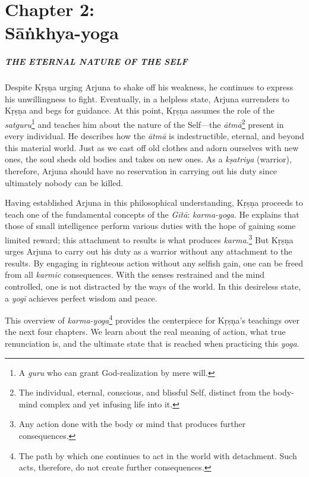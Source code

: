 \chapter{Chapter 2: \\Sāṅkhya-yoga}\label{chap-sankhya-yoga}

\paragraph*{\MakeUppercase{The Eternal Nature of the Self}}

\noindent Despite Kṛṣṇa urging Arjuna to shake off his weakness, he continues to express his unwillingness to fight. Eventually, in a helpless state, Arjuna surrenders to Kṛṣṇa and begs for guidance. At this point, Kṛṣṇa assumes the role of the \textit{satguru}\footnote{A \textit{guru} who can grant God-realization by mere will.} and teaches him about the nature of the Self---the \textit{ātmā}\footnote{The individual, eternal, conscious, and blissful Self, distinct from the body-mind complex and yet infusing life into it.} present in every individual. He describes how the \textit{ātmā} is indestructible, eternal, and beyond this material world. Just as we cast off old clothes and adorn ourselves with new ones, the soul sheds old bodies and takes on new ones. As a \textit{kṣatriya} (warrior), therefore, Arjuna should have no reservation in carrying out his duty since ultimately nobody can be killed.

Having established Arjuna in this philosophical understanding, Kṛṣṇa proceeds to teach one of the fundamental concepts of the \textit{Gītā}: \textit{karma-yoga}. He explains that those of small intelligence perform various duties with the hope of gaining some limited reward; this attachment to results is what produces \textit{karma}.\footnote{Any action done with the body or mind that produces further consequences.} But Kṛṣṇa urges Arjuna to carry out his duty as a warrior without any attachment to the results. By engaging in righteous action without any selfish gain, one can be freed from all \textit{karmic} consequences. With the senses restrained and the mind controlled, one is not distracted by the ways of the world. In this desireless state, a \textit{yogī} achieves perfect wisdom and peace.

This overview of \textit{karma-yoga}\footnote{The path by which one continues to act in the world with detachment. Such acts, therefore, do not create further consequences.
} provides the centerpiece for Kṛṣṇa's teachings over the next four chapters. We learn about the real meaning of action, what true renunciation is, and the ultimate state that is reached when practicing this \textit{yoga}.


